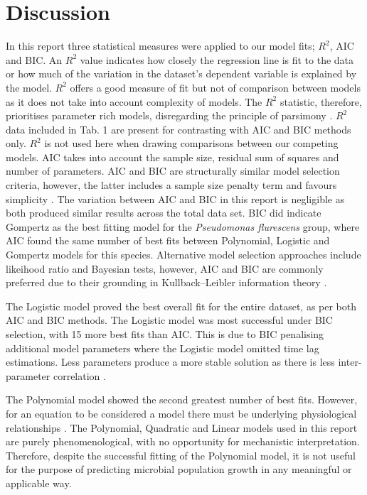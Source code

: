 \documentclass[titlepage]{article}
\begin{document}
\section{Discussion}
In this report three statistical measures were applied to our model fits; $R^2$, AIC and BIC. An $R^2$ value indicates how closely the regression line is fit to the data or how much of the variation in the dataset's dependent variable is explained by the model. $R^2$ offers a good measure of fit but not of comparison between models as it does not take into account complexity of models. The $R^2$ statistic, therefore, prioritises parameter rich models, disregarding the principle of parsimony \cite{johnson2004model}. $R^2$ data included in Tab. 1 are present for contrasting with AIC and BIC methods only. $R^2$ is not used here when drawing comparisons between our competing models. AIC takes into account the sample size, residual sum of squares and number of parameters. AIC and BIC are structurally similar model selection criteria, however, the latter includes a sample size penalty term and favours simplicity \cite{johnson2004model}. The variation between AIC and BIC in this report is negligible as both produced similar results across the total data set. BIC did indicate Gompertz as the best fitting model for the \textit{Pseudomonas flurescens} group, where AIC found the same number of best fits between Polynomial, Logistic and Gompertz models for this species. Alternative model selection approaches include likeihood ratio and Bayesian tests, however, AIC and BIC are commonly preferred due to their grounding in Kullback–Leibler information theory \cite{johnson2004model}. \
      
\indent The Logistic model proved the best overall fit for the entire dataset, as per both AIC and BIC methods. The Logistic model was most successful under BIC selection, with 15 more best fits than AIC. This is due to BIC penalising additional model parameters where the Logistic model omitted time lag estimations. Less parameters produce a more stable solution as there is less inter-parameter correlation \cite{zwietering1990modeling}.\

  \indent The Polynomial model showed the second greatest number of best fits. However, for an equation to be considered a model there must be underlying physiological relationships \cite{baranyi1995mathematics}. The Polynomial, Quadratic and Linear models used in this report are purely phenomenological, with no opportunity for mechanistic interpretation. Therefore, despite the successful fitting of the Polynomial model, it is not useful for the purpose of predicting microbial population growth in any meaningful or applicable way. \
  
\end{document}
